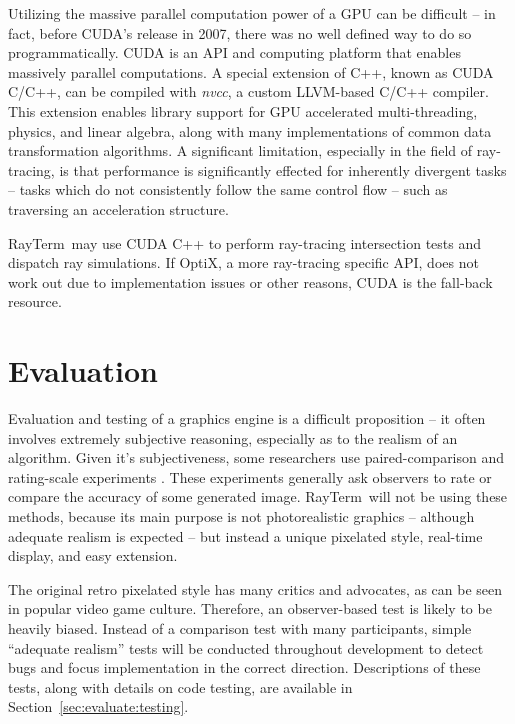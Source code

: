 \documentclass[11pt]{article}
\newcommand{\name}{{\sc RayTerm}}
\begin{document}
Utilizing the massive parallel computation power of a GPU can be difficult -- in fact, before CUDA's release in 2007, there was no well defined way to do so programmatically.
CUDA is an API and computing platform that enables massively parallel computations.
A special extension of C++, known as CUDA C/C++, can be compiled with {\it nvcc}, a custom LLVM-based C/C++ compiler.
This extension enables library support for GPU accelerated multi-threading, physics, and linear algebra, along with many implementations of common data transformation algorithms.
A significant limitation, especially in the field of ray-tracing, is that performance is significantly effected for inherently divergent tasks -- tasks which do not consistently follow the same control flow -- such as traversing an acceleration structure.

\name\ may use CUDA C++ to perform ray-tracing intersection tests and dispatch ray simulations.
If OptiX, a more ray-tracing specific API, does not work out due to implementation issues or other reasons, CUDA is the fall-back resource.

\section{Evaluation}
\label{sec:evaluate}


Evaluation and testing of a graphics engine is a difficult proposition -- it often involves extremely subjective reasoning, especially as to the realism of an algorithm.
Given it's subjectiveness, some researchers use paired-comparison and rating-scale experiments \cite{kuang2007evaluating}.
These experiments generally ask observers to rate or compare the accuracy of some generated image.
\name\ will not be using these methods, because its main purpose is not photorealistic graphics -- although adequate realism is expected -- but instead a unique pixelated style, real-time display, and easy extension.

The original retro pixelated style has many critics and advocates, as can be seen in popular video game culture.
Therefore, an observer-based test is likely to be heavily biased.
Instead of a comparison test with many participants, simple ``adequate realism'' tests will be conducted throughout development to detect bugs and focus implementation in the correct direction.
Descriptions of these tests, along with details on code testing, are available in Section~\ref{sec:evaluate:testing}.
\end{document}
